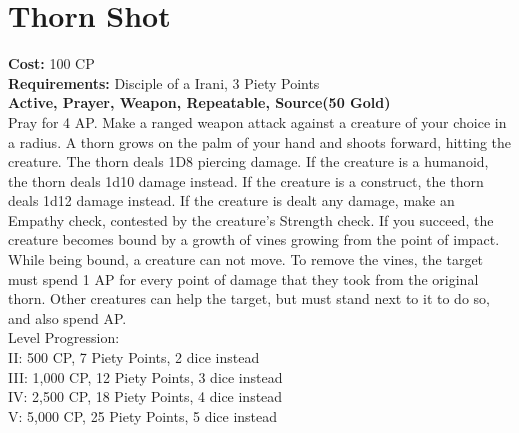 \section{Thorn Shot}\label{prayer:thornShot}
\textbf{Cost:} 100 CP\\
\textbf{Requirements:} Disciple of a Irani, 3 Piety Points \\
\textbf{Active, Prayer, Weapon, Repeatable, Source(50 Gold)}\\
Pray for 4 AP. Make a ranged weapon attack against a creature of your choice in a  radius.
A thorn grows on the palm of your hand and shoots forward, hitting the creature.
The thorn deals 1D8 piercing damage.
If the creature is a humanoid, the thorn deals 1d10 damage instead.
If the creature is a construct, the thorn deals 1d12 damage instead.
If the creature is dealt any damage, make an Empathy check, contested by the creature's Strength check.
If you succeed, the creature becomes bound by a growth of vines growing from the point of impact.
While being bound, a creature can not move.
To remove the vines, the target must spend 1 AP for every point of damage that they took from the original thorn.
Other creatures can help the target, but must stand next to it to do so, and also spend AP.
\\
Level Progression:\\
II: 500 CP, 7 Piety Points, 2 dice instead\\
III: 1,000 CP, 12 Piety Points, 3 dice instead\\
IV: 2,500 CP, 18 Piety Points, 4 dice instead\\
V: 5,000 CP, 25 Piety Points, 5 dice instead\\